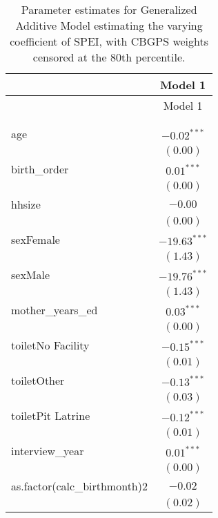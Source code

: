 
\begin{longtable}{l c}
\hline
 & Model 1 \\
\hline
\endfirsthead
\hline
 & Model 1 \\
\hline
\endhead
\hline
\endfoot
\hline
\multicolumn{2}{l}{\scriptsize{$^{***}p<0.001$; $^{**}p<0.01$; $^{*}p<0.05$}}\\
\caption{Parameter estimates for Generalized Additive Model estimating the varying coefficient of SPEI, with CBGPS weights censored at the 80th percentile.}
\label{table:coefficients}
\endlastfoot \\
age                              & $-0.02^{***}$  \\
                                 & $(0.00)$       \\
birth\_order                     & $0.01^{***}$   \\
                                 & $(0.00)$       \\
hhsize                           & $-0.00$        \\
                                 & $(0.00)$       \\
sexFemale                        & $-19.63^{***}$ \\
                                 & $(1.43)$       \\
sexMale                          & $-19.76^{***}$ \\
                                 & $(1.43)$       \\
mother\_years\_ed                & $0.03^{***}$   \\
                                 & $(0.00)$       \\
toiletNo Facility                & $-0.15^{***}$  \\
                                 & $(0.01)$       \\
toiletOther                      & $-0.13^{***}$  \\
                                 & $(0.03)$       \\
toiletPit Latrine                & $-0.12^{***}$  \\
                                 & $(0.01)$       \\
interview\_year                  & $0.01^{***}$   \\
                                 & $(0.00)$       \\
as.factor(calc\_birthmonth)2     & $-0.02$        \\
                                 & $(0.02)$       \\

\end{longtable}
